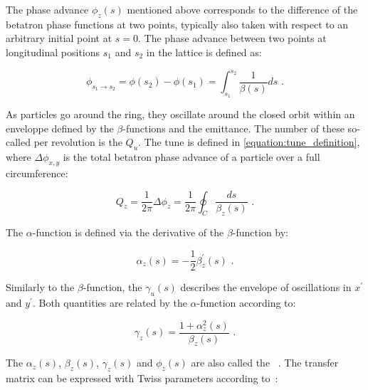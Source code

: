 The phase advance \(\phi_z(s)\) mentioned above corresponds to the difference of the betatron phase functions at two points, typically also taken with respect to an arbitrary initial point at \(s = 0\).
The phase advance between two points at longitudinal positions \(s_1\) and \(s_2\) in the lattice is defined as:

\begin{equation}
    \phi_{s_1 \rightarrow s_2} = \phi(s_{2}) - \phi(s_{1}) = \int_{s_{1}}^{s_{2}} \frac{1}{\beta(s)} ds \text{ .}
    \label{equation:phase_advance_definition}
\end{equation}

As particles go around the ring, they oscillate around the closed orbit within an enveloppe defined by the \(\beta\)-functions and the emittance.
The number of these so-called  per revolution is the  \(Q_u\).
The tune is defined in \cref{equation:tune_definition}, where \(\Delta \phi_{x, y}\) is the total betatron phase advance of a particle over a full circumference:

\begin{equation}
    Q_z = \frac{1}{2 \pi} \Delta \phi_z = \frac{1}{2 \pi} \oint_C \dfrac{ds}{\beta_z (s)} \text{ .}
    \label{equation:tune_definition}
\end{equation}

The \(\alpha\)-function is defined via the derivative of the \(\beta\)-function by:

\begin{equation}
    \alpha_z(s) = - \frac{1}{2} \beta^{\prime}_z(s) \text{ .}
    \label{equation:alpha_function}
\end{equation}

Similarly to the \(\beta\)-function, the  \(\gamma_u(s)\) describes the envelope of oscillations in \(x^{\prime}\) and \(y^{\prime}\).
Both quantities are related by the \(\alpha\)-function according to:

\begin{equation}
    \gamma_z(s) = \frac{1 + \alpha_z^2(s)}{\beta_z(s)} \text{ .}
    \label{equation:gamma_function}
\end{equation}

The \(\alpha_z(s)\), \(\beta_z(s)\), \(\gamma_z(s)\) and \(\phi_z(s)\) are also called the ~\cite{RSI:Twiss:Orbital_Stability_Proton_Synchrotron}.
The transfer matrix can be expressed with Twiss parameters according to~\cite{AOP:COURANT:Theory_Alternating_Gradient_Synchrotron}:

